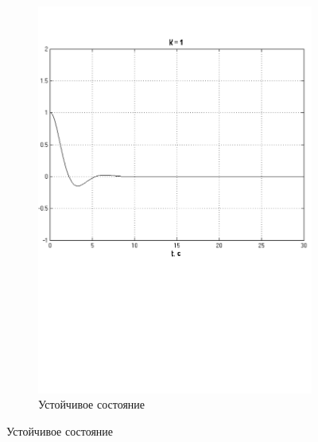 \documentclass[a4paper, 11pt, russian]{article}
\begin{document}
\begin{figure}[ht!]
\begin{subfigure}[b]{0.49\textwidth}
            \includegraphics[width = \textwidth]{stable}
            \centering
            \caption{Устойчивое состояние}
        \end{subfigure}
        

\end{figure}
\end{document}
